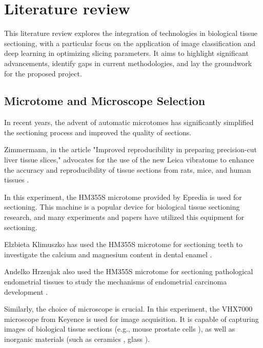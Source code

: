 \section{Literature review}

This literature review explores the integration of technologies in biological tissue sectioning, with a particular focus on the application of image classification and deep learning in optimizing slicing parameters. It aims to highlight significant advancements, identify gaps in current methodologies, and lay the groundwork for the proposed project.

\subsection{Microtome and Microscope Selection}

In recent years, the advent of automatic microtomes has significantly simplified the sectioning process and improved the quality of sections.

Zimmermann, in the article "Improved reproducibility in preparing precision-cut liver tissue slices," advocates for the use of the new Leica vibratome to enhance the accuracy and reproducibility of tissue sections from rats, mice, and human tissues \cite{LR.1}.

In this experiment, the HM355S microtome provided by Epredia is used for sectioning. This machine is a popular device for biological tissue sectioning research, and many experiments and papers have utilized this equipment for sectioning.

Elzbieta Klimuszko has used the HM355S microtome for sectioning teeth to investigate the calcium and magnesium content in dental enamel \cite{LR.2}.

Andelko Hrzenjak also used the HM355S microtome for sectioning pathological endometrial tissues to study the mechanisms of endometrial carcinoma development \cite{LR.3}.

Similarly, the choice of microscope is crucial. In this experiment, the VHX7000 microscope from Keyence is used for image acquisition. It is capable of capturing images of biological tissue sections (e.g., mouse prostate cells \cite{LR.4}),
as well as inorganic materials (such as ceramics \cite{LR.5}, glass \cite{LR.6}).

